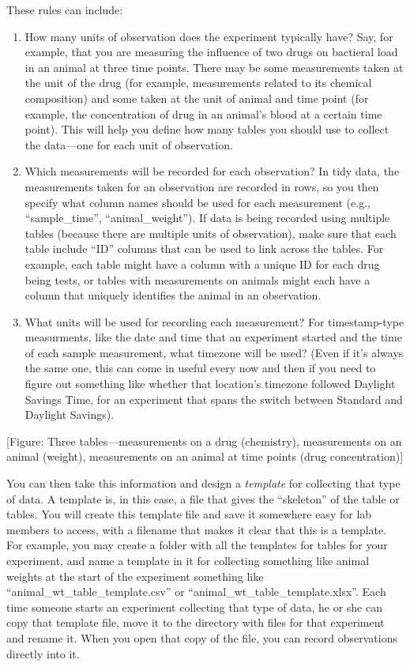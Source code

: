 \documentclass[]{tufte-book}
\providecommand{\tightlist}{%
  \setlength{\itemsep}{0pt}\setlength{\parskip}{0pt}}
\begin{document}
These rules can include:

\begin{enumerate}
\def\labelenumi{\arabic{enumi}.}
\tightlist
\item
  How many units of observation does the experiment typically have?
  Say, for example, that you are measuring the influence of two drugs on
  bactieral load in an animal at
  three time points. There may be some measurements taken at the unit of the drug
  (for example, measurements related to its chemical composition) and some
  taken at the unit of animal and time point (for example, the concentration of drug in
  an animal's blood at a certain time point). This will help you define how many
  tables you should use to collect the data---one for each unit of observation.
\item
  Which measurements will be recorded for each observation? In tidy data, the measurements
  taken for an observation are recorded in rows, so you then specify what
  column names should be used for each measurement (e.g., ``sample\_time'',
  ``animal\_weight''). If data is being recorded using multiple tables (because there
  are multiple units of observation), make sure that each table include
  ``ID'' columns that can be used to link across the tables. For example, each
  table might have a column with a unique ID for each drug being tests, or tables
  with measurements on animals might each have a column that uniquely identifies
  the animal in an observation.
\item
  What units will be used for recording each measurement? For timestamp-type
  measurments, like the date and time that an experiment started and the time of
  each sample measurement, what timezone will be used? (Even if it's always the
  same one, this can come in useful every now and then if you need to figure out
  something like whether that location's timezone followed Daylight Savings Time,
  for an experiment that spans the switch between Standard and Daylight Savings).
\end{enumerate}

{[}Figure: Three tables---measurements on a drug (chemistry), measurements on an animal (weight),
measurements on an animal at time points (drug concentration){]}

You can then take this information and design a \emph{template} for collecting that
type of data. A template is, in this case, a file that gives the ``skeleton'' of
the table or tables. You will create this template file and save it somewhere
easy for lab members to access, with a filename that makes it clear that this is
a template. For example, you may create a folder with all the templates for
tables for your experiment, and name a template in it for collecting something
like animal weights at the start of the experiment something like
``animal\_wt\_table\_template.csv'' or ``animal\_wt\_table\_template.xlsx''.
Each time someone starts an experiment collecting that type of data, he or she
can copy that template file, move it to the directory with files for that
experiment and rename it. When you open that copy of the file, you can record
observations directly into it.
\end{document}

